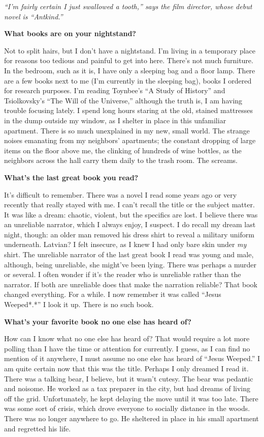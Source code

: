 \emph{``I'm fairly certain I just swallowed a tooth,'' says the film
director, whose debut novel is ``Antkind.''}

\textbf{What books are on your nightstand?}

Not to split hairs, but I don't have a nightstand. I'm living in a
temporary place for reasons too tedious and painful to get into here.
There's not much furniture. In the bedroom, such as it is, I have only a
sleeping bag and a floor lamp. There are a few books next to me (I'm
currently in the sleeping bag), books I ordered for research purposes.
I'm reading Toynbee's ``A Study of History'' and Tsiolkovsky's ``The
Will of the Universe,'' although the truth is, I am having trouble
focusing lately. I spend long hours staring at the old, stained
mattresses in the dump outside my window, as I shelter in place in this
unfamiliar apartment. There is so much unexplained in my new, small
world. The strange noises emanating from my neighbors' apartments; the
constant dropping of large items on the floor above me, the clinking of
hundreds of wine bottles, as the neighbors across the hall carry them
daily to the trash room. The screams.

\textbf{What's the last great book you read?}

It's difficult to remember. There was a novel I read some years ago or
very recently that really stayed with me. I can't recall the title or
the subject matter. It was like a dream: chaotic, violent, but the
specifics are lost. I believe there was an unreliable narrator, which I
always enjoy, I suspect. I do recall my dream last night, though: an
older man removed his dress shirt to reveal a military uniform
underneath. Latvian? I felt insecure, as I knew I had only bare skin
under \emph{my} shirt. The unreliable narrator of the last great book I
read was young and male, although, being unreliable, she might've been
lying. There was perhaps a murder or several. I often wonder if it's the
reader who is unreliable rather than the narrator. If both are
unreliable does that make the narration reliable? That book changed
everything. For a while. I now remember it was called ``Jesus
Weeped*.*'' I look it up. There is no such book.

\textbf{What's your favorite book no one else has heard of?}

How can I know what no one else has heard of? That would require a lot
more polling than I have the time or attention for currently. I guess,
as I can find no mention of it anywhere, I must assume no one else has
heard of ``Jesus Weeped.'' I am quite certain now that this was the
title. Perhaps I only dreamed I read it. There was a talking bear, I
believe, but it wasn't cutesy. The bear was pedantic and noisome. He
worked as a tax preparer in the city, but had dreams of living off the
grid. Unfortunately, he kept delaying the move until it was too late.
There was some sort of crisis, which drove everyone to socially distance
in the woods. There was no longer anywhere to go. He sheltered in place
in his small apartment and regretted his life.

